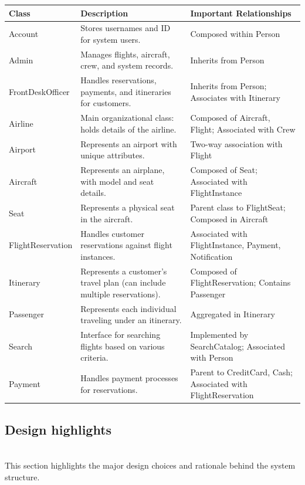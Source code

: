 \begin{tabular}{|>{\raggedright\arraybackslash}p{3cm}|>{\raggedright\arraybackslash}p{6cm}|>{\raggedright\arraybackslash}p{6cm}|}
\hline
\textbf{Class} & \textbf{Description} & \textbf{Important Relationships} \\
\hline
Account & Stores usernames and ID for system users. & Composed within Person \\
\hline
Admin & Manages flights, aircraft, crew, and system records. & Inherits from Person \\
\hline
FrontDeskOfficer & Handles reservations, payments, and itineraries for customers. & Inherits from Person; Associates with Itinerary \\
\hline
Airline & Main organizational class: holds details of the airline. & Composed of Aircraft, Flight; Associated with Crew \\
\hline
Airport & Represents an airport with unique attributes. & Two-way association with Flight \\
\hline
Aircraft & Represents an airplane, with model and seat details. & Composed of Seat; Associated with FlightInstance \\
\hline
Seat & Represents a physical seat in the aircraft. & Parent class to FlightSeat; Composed in Aircraft \\
\hline
FlightReservation & Handles customer reservations against flight instances. & Associated with FlightInstance, Payment, Notification \\
\hline
Itinerary & Represents a customer’s travel plan (can include multiple reservations). & Composed of FlightReservation; Contains Passenger \\
\hline
Passenger & Represents each individual traveling under an itinerary. & Aggregated in Itinerary \\
\hline
Search & Interface for searching flights based on various criteria. & Implemented by SearchCatalog; Associated with Person \\
\hline
Payment & Handles payment processes for reservations. & Parent to CreditCard, Cash; Associated with FlightReservation \\
\hline
\end{tabular}

\subsection{Design highlights}\label{YN5aY8YyN553Av85MLw2c}
\\
This section highlights the major design choices and rationale behind the system structure.

